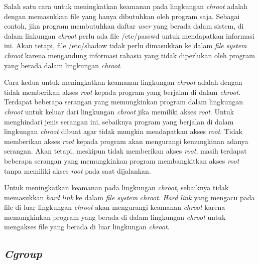 \par Salah satu cara untuk meningkatkan keamanan pada lingkungan \textit{chroot} adalah dengan memasukkan file yang hanya dibutuhkan oleh program saja. Sebagai contoh, jika program membutuhkan daftar \textit{user} yang berada dalam sistem, di dalam linkungan \textit{chroot} perlu ada file /etc/passwd untuk mendapatkan informasi ini. Akan tetapi, file /etc/shadow tidak perlu dimasukkan ke dalam \textit{file system} \textit{chroot} karena mengandung informasi rahasia yang tidak diperlukan oleh program yang berada dalam lingkungan \textit{chroot}.

\par Cara kedua untuk meningkatkan keamanan lingkungan \textit{chroot} adalah dengan tidak memberikan akses \textit{root} kepada program yang berjalan di dalam \textit{chroot}. Terdapat beberapa serangan yang memungkinkan program dalam lingkungan \textit{chroot} untuk keluar dari lingkungan \textit{chroot} jika memiliki akses \textit{root}. Untuk menghindari jenis serangan ini, sebaiknya program yang berjalan di dalam lingkungan \textit{chroot} dibuat agar tidak mungkin mendapatkan akses \textit{root}. Tidak memberikan akses \textit{root} kepada program akan mengurangi kemungkinan adanya serangan. Akan tetapi, meskipun tidak memberikan akses \textit{root}, masih terdapat beberapa serangan yang memungkinkan program membangkitkan akses \textit{root} tanpa memiliki akses \textit{root} pada saat dijalankan.

\par Untuk meningkatkan keamanan pada lingkungan \textit{chroot}, sebaiknya tidak memasukkan \textit{hard link} ke dalam \textit{file system} \textit{chroot}. \textit{Hard link} yang mengacu pada file di luar lingkungan \textit{chroot} akan mengurangi keamanan \textit{chroot} karena memungkinkan program yang berada di dalam lingkungan \textit{chroot} untuk mengakses file yang berada di luar lingkungan \textit{chroot}.

\subsection{\textit{Cgroup}}



